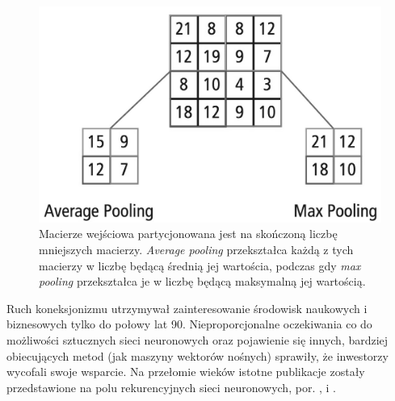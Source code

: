 \documentclass[12pt,a4paper,twoside]{article}
\begin{document}
\begin{figure}[h]
  \centering
\includegraphics[scale=0.2]{../obrazy/fig:pooling.png}
\caption{Macierze wejściowa partycjonowana jest na skończoną liczbę mniejszych macierzy. \textit{Average pooling} przekształca każdą z tych macierzy w liczbę będącą średnią jej wartościa, podczas gdy \textit{max pooling} przekształca je w liczbę będącą maksymalną jej wartością. \label{fig:pooling}}
\end{figure}

Ruch koneksjonizmu utrzymywał zainteresowanie środowisk naukowych i biznesowych tylko do połowy lat 90. Nieproporcjonalne oczekiwania co do możliwości sztucznych sieci neuronowych oraz pojawienie się innych, bardziej obiecujących metod (jak maszyny wektorów nośnych) sprawiły, że inwestorzy wycofali swoje wsparcie. Na przełomie wieków istotne publikacje zostały przedstawione na polu rekurencyjnych sieci neuronowych, por. \citet{schmidhuber1997}, \citet{schuster1997} i \citet{graves2005}.
\end{document}
